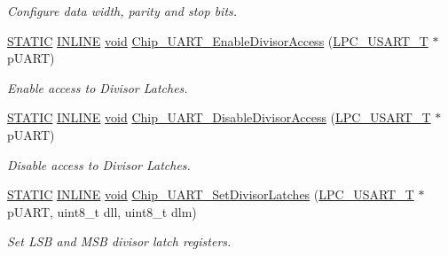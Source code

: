 \begin{DoxyCompactItemize}
\begin{DoxyCompactList}\small\item\em Configure data width, parity and stop bits. \end{DoxyCompactList}\item 
\hyperlink{group__LPC__Types__Public__Macros_ga10b2d890d871e1489bb02b7e70d9bdfb}{S\-T\-A\-T\-I\-C} \hyperlink{group__LPC__Types__Public__Types_ga2eb6f9e0395b47b8d5e3eeae4fe0c116}{I\-N\-L\-I\-N\-E} \hyperlink{Paradigm_2Tern__EE_2small_2portmacro_8h_a14d32f8130d3c0b212cfc751730b5b49}{void} \hyperlink{group__UART__17XX__40XX_ga7a8e9260541ab5cacefcacbd94725d52}{Chip\-\_\-\-U\-A\-R\-T\-\_\-\-Enable\-Divisor\-Access} (\hyperlink{structLPC__USART__T}{L\-P\-C\-\_\-\-U\-S\-A\-R\-T\-\_\-\-T} $\ast$p\-U\-A\-R\-T)
\begin{DoxyCompactList}\small\item\em Enable access to Divisor Latches. \end{DoxyCompactList}\item 
\hyperlink{group__LPC__Types__Public__Macros_ga10b2d890d871e1489bb02b7e70d9bdfb}{S\-T\-A\-T\-I\-C} \hyperlink{group__LPC__Types__Public__Types_ga2eb6f9e0395b47b8d5e3eeae4fe0c116}{I\-N\-L\-I\-N\-E} \hyperlink{Paradigm_2Tern__EE_2small_2portmacro_8h_a14d32f8130d3c0b212cfc751730b5b49}{void} \hyperlink{group__UART__17XX__40XX_ga81a3df6028c4b08dba38e4f6330d41d7}{Chip\-\_\-\-U\-A\-R\-T\-\_\-\-Disable\-Divisor\-Access} (\hyperlink{structLPC__USART__T}{L\-P\-C\-\_\-\-U\-S\-A\-R\-T\-\_\-\-T} $\ast$p\-U\-A\-R\-T)
\begin{DoxyCompactList}\small\item\em Disable access to Divisor Latches. \end{DoxyCompactList}\item 
\hyperlink{group__LPC__Types__Public__Macros_ga10b2d890d871e1489bb02b7e70d9bdfb}{S\-T\-A\-T\-I\-C} \hyperlink{group__LPC__Types__Public__Types_ga2eb6f9e0395b47b8d5e3eeae4fe0c116}{I\-N\-L\-I\-N\-E} \hyperlink{Paradigm_2Tern__EE_2small_2portmacro_8h_a14d32f8130d3c0b212cfc751730b5b49}{void} \hyperlink{group__UART__17XX__40XX_ga267fa73ca52d35a7f60f849727c3d2b6}{Chip\-\_\-\-U\-A\-R\-T\-\_\-\-Set\-Divisor\-Latches} (\hyperlink{structLPC__USART__T}{L\-P\-C\-\_\-\-U\-S\-A\-R\-T\-\_\-\-T} $\ast$p\-U\-A\-R\-T, uint8\-\_\-t dll, uint8\-\_\-t dlm)
\begin{DoxyCompactList}\small\item\em Set L\-S\-B and M\-S\-B divisor latch registers. \end{DoxyCompactList}\item 

\end{DoxyCompactItemize}

